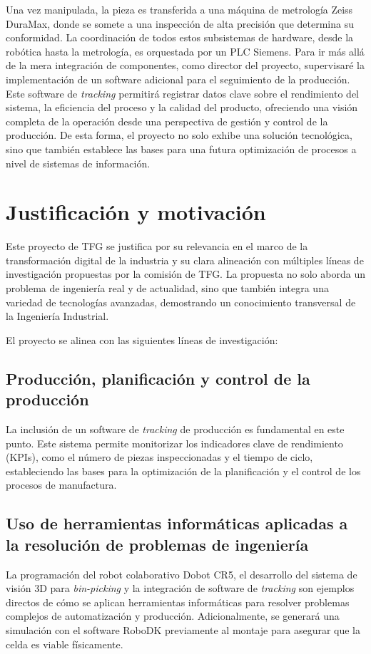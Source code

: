 \documentclass[12pt, a4paper]{article}
\begin{document}
Una vez manipulada, la pieza es transferida a una máquina de metrología Zeiss DuraMax, donde se somete a una inspección de alta precisión que determina su conformidad. La coordinación de todos estos subsistemas de hardware, desde la robótica hasta la metrología, es orquestada por un PLC Siemens. Para ir más allá de la mera integración de componentes, como director del proyecto, supervisaré la implementación de un software adicional para el seguimiento de la producción. Este software de \textit{tracking} permitirá registrar datos clave sobre el rendimiento del sistema, la eficiencia del proceso y la calidad del producto, ofreciendo una visión completa de la operación desde una perspectiva de gestión y control de la producción. De esta forma, el proyecto no solo exhibe una solución tecnológica, sino que también establece las bases para una futura optimización de procesos a nivel de sistemas de información.

\section{Justificación y motivación}
Este proyecto de TFG se justifica por su relevancia en el marco de la transformación digital de la industria y su clara alineación con múltiples líneas de investigación propuestas por la comisión de TFG. La propuesta no solo aborda un problema de ingeniería real y de actualidad, sino que también integra una variedad de tecnologías avanzadas, demostrando un conocimiento transversal de la Ingeniería Industrial.

El proyecto se alinea con las siguientes líneas de investigación:

\subsection{Producción, planificación y control de la producción}
La inclusión de un software de \textit{tracking} de producción es fundamental en este punto. Este sistema permite monitorizar los indicadores clave de rendimiento (KPIs), como el número de piezas inspeccionadas y el tiempo de ciclo, estableciendo las bases para la optimización de la planificación y el control de los procesos de manufactura.

\subsection{Uso de herramientas informáticas aplicadas a la resolución de problemas de ingeniería}
La programación del robot colaborativo Dobot CR5, el desarrollo del sistema de visión 3D para \textit{bin-picking} y la integración de software de \textit{tracking} son ejemplos directos de cómo se aplican herramientas informáticas para resolver problemas complejos de automatización y producción. Adicionalmente, se generará una simulación con el software RoboDK previamente al montaje para asegurar que la celda es viable físicamente.
\end{document}
